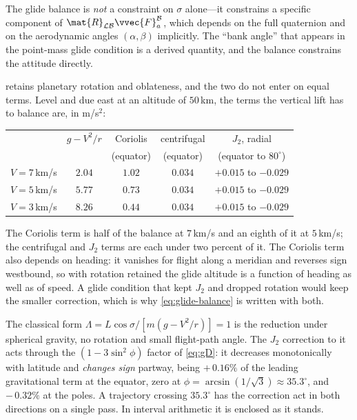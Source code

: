 \begin{remark}\label{rem:manifold-attitude}
The glide balance is \emph{not} a constraint on
$\sigma$ alone---it constrains a specific component of
$\mat{R}_{\mathcal{L}\mathcal{B}} \vvec{F}_a^{\mathcal{B}}$, which
depends on the full quaternion and on the aerodynamic angles
$(\alpha,\beta)$ implicitly. The ``bank angle'' that appears in the
point-mass glide condition is a derived quantity, and the balance
constrains the attitude directly.
\end{remark}

\begin{remark}\label{rem:j2-glide}
 retains planetary rotation and oblateness, and the
two do not enter on equal terms. Level and due east at an altitude of
$50$\,km, the terms the vertical lift has to balance are, in m/s$^2$:
\begin{center}
\begin{tabular}{@{}lcccc@{}}
\toprule
 & $g - V^2/r$ & Coriolis & centrifugal & $J_2$, radial \\
 & & (equator) & (equator) & (equator to $80^\circ$) \\
\midrule
$V = 7$\,km/s & $2.04$ & $1.02$ & $0.034$ & ${+}0.015$ to ${-}0.029$ \\
$V = 5$\,km/s & $5.77$ & $0.73$ & $0.034$ & ${+}0.015$ to ${-}0.029$ \\
$V = 3$\,km/s & $8.26$ & $0.44$ & $0.034$ & ${+}0.015$ to ${-}0.029$ \\
\bottomrule
\end{tabular}
\end{center}
The Coriolis term is half of the balance at $7$\,km/s and an eighth of it
at $5$\,km/s; the centrifugal and $J_2$ terms are each under two percent of
it. The Coriolis term also depends on
heading: it vanishes for flight along a meridian and reverses sign
westbound, so with rotation retained the glide altitude is a function of
heading as well as of speed. A glide condition that kept $J_2$ and dropped
rotation would keep the smaller correction, which is why
\cref{eq:glide-balance} is written with both.

The classical form $\Lambda = L\cos\sigma/[m(g-V^2/r)] = 1$ is the reduction
under spherical gravity, no rotation and small flight-path angle. The $J_2$
correction to it acts through the $(1-3\sin^2\!\phi)$ factor of
\cref{eq:gD}: it decreases monotonically with latitude and \emph{changes
sign} partway, being ${+}\,0.16\%$ of the leading gravitational term at the
equator, zero at $\phi = \arcsin(1/\sqrt{3}) \approx 35.3^\circ$, and
${-}\,0.32\%$ at the poles. A trajectory crossing $35.3^\circ$ has the
correction act in both directions on a single pass. In interval
arithmetic it is enclosed as it stands.
\end{remark}

